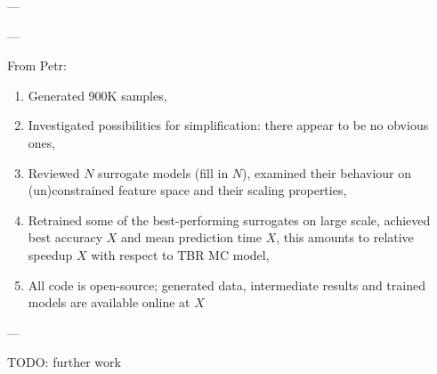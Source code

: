 ---




---

From Petr:

\begin{enumerate}
	\item Generated 900K samples,
	\item Investigated possibilities for simplification: there appear to be no
		obvious ones,
	\item Reviewed $N$ surrogate models (fill in $N$), examined their behaviour
		on (un)constrained feature space and their scaling properties,
	\item Retrained some of the best-performing surrogates on large scale,
		achieved best accuracy $X$ and mean prediction time $X$, this amounts to
		relative speedup $X$ with respect to TBR MC model,
	\item All code is open-source; generated data, intermediate results and
		trained models are available online at $X$
\end{enumerate}

---

TODO: further work

\newpage
